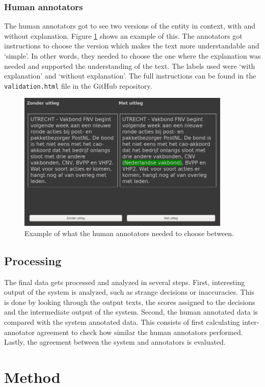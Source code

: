 \documentclass[
10pt, %
a4paper, %
oneside, %
headinclude,footinclude, %
] {book}%
\begin{document}
\subsection{Human annotators}
The human annotators got to see two versions of the entity in context, with and without explanation.
Figure \ref{figure:validation} shows an example of this.
The annotators got instructions to choose the version which makes the text more understandable and `simple'.
In other words, they needed to choose the one where the explanation was needed and supported the understanding of the text.
The labels used were `with explanation' and `without explanation'.
The full instructions can be found in the \verb+validation.html+ file in the GitHub repository.

\begin{figure}[hbtp]\centering
  \includegraphics[width=4in]{validation_example.png}
  \caption{Example of what the human annotators needed to choose between.\label{figure:validation}}
\end{figure}

\section{Processing}
The final data gets processed and analyzed in several steps.
First, interesting output of the system is analyzed, such as strange decisions or inaccuracies.
This is done by looking through the output texts, the scores assigned to the decisions and the intermediate output of the system.
Second, the human annotated data is compared with the system annotated data.
This consists of first calculating inter-annotator agreement to check how similar the human annotators performed.
Lastly, the agreement between the system and annotators is evaluated.

\chapter{Method}
\end{document}
